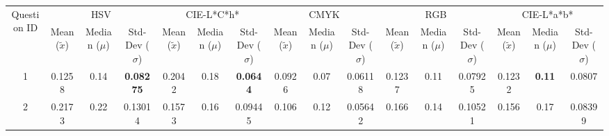 \begin{table}[htbp]
  \resizebox{\textwidth}{!} {
  \begin{tabular}{@{}cccccccccccccccc@{}}
    \toprule
    \multirow{2}{*}{Question ID} & \multicolumn{3}{c}{HSV}                                                                                            & \multicolumn{3}{c}{CIE-L*C*h*}                                                                                     & \multicolumn{3}{c}{CMYK}                                                                                          & \multicolumn{3}{c}{RGB}                                                                                            & \multicolumn{3}{c}{CIE-L*a*b*}                                                                                    \\ \cmidrule(l){2-16}
                                 & Mean ($\tilde{x}$)                   & Median ($\mu$)                      & \multicolumn{1}{c||}{Std-Dev ($\sigma$)}& Mean ($\tilde{x}$)                  & Median ($\mu$)                      & \multicolumn{1}{c||}{Std-Dev ($\sigma$)}   & Mean ($\tilde{x}$)               & Median ($\mu$)                     & \multicolumn{1}{c||}{Std-Dev ($\sigma$)} & Mean ($\tilde{x}$)                  & Median ($\mu$)                      & \multicolumn{1}{c|}{Std-Dev ($\sigma$)} & Mean ($\tilde{x}$)                 & Median ($\mu$)                     & \multicolumn{1}{c|}{Std-Dev ($\sigma$)}          \\ \midrule
    \multicolumn{1}{|c|}{1}      & \multicolumn{1}{c|}{0.1258}          & \multicolumn{1}{c|}{0.14}           & \multicolumn{1}{c||}{\textbf{0.08275}} & \multicolumn{1}{c|}{0.2042}          & \multicolumn{1}{c|}{0.18}           & \multicolumn{1}{c||}{\textbf{0.0644}}  & \multicolumn{1}{c|}{0.0926}          & \multicolumn{1}{c|}{0.07}          & \multicolumn{1}{c||}{0.06118}          & \multicolumn{1}{c||}{0.1237}          & \multicolumn{1}{c|}{0.11}           & \multicolumn{1}{c|}{0.07925}          & \multicolumn{1}{c|}{0.1232}          & \multicolumn{1}{c|}{\textbf{0.11}} & \multicolumn{1}{c|}{0.0807}           \\ \midrule
    \multicolumn{1}{|c|}{2}      & \multicolumn{1}{c|}{0.2173}          & \multicolumn{1}{c|}{0.22}           & \multicolumn{1}{c||}{0.13014}          & \multicolumn{1}{c|}{0.1573}          & \multicolumn{1}{c|}{0.16}           & \multicolumn{1}{c||}{0.09445}          & \multicolumn{1}{c|}{0.106}           & \multicolumn{1}{c|}{0.12}          & \multicolumn{1}{c||}{0.05642}          & \multicolumn{1}{c||}{0.166}           & \multicolumn{1}{c|}{0.14}           & \multicolumn{1}{c|}{0.10521}          & \multicolumn{1}{c|}{0.156}           & \multicolumn{1}{c|}{0.17}          & \multicolumn{1}{c|}{0.08399}          \\ \midrule

\end{tabular}}
\end{table}
